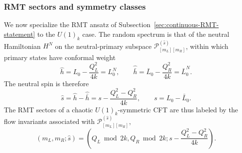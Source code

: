 \documentclass[11pt]{article}
\numberwithin{equation}{section}
\begin{document}
\subsubsection{RMT sectors and symmetry classes}
\label{sec:U1-RMT-expectations}

We now specialize the RMT ansatz of Subsection~\ref{sec:continuous-RMT-statement} to the $U(1)_k$ case.
The random spectrum is that of the neutral Hamiltonian $H^N$ on the neutral-primary subspace $\mathcal P_{[m_L][m_R]}^{(\hat s)}$, within which primary states have conformal weight
\begin{equation}
\hat h=L_0-\frac{Q_L^2}{4k}=L_0^N,
\qquad \hat{\bar h}=\bar L_0-\frac{Q_R^2}{4k}=\bar L_0^N.
\end{equation}
The neutral spin is therefore
\begin{equation}
\hat s=\hat h-\hat{\bar h}
 =s-\frac{Q_L^2-Q_R^2}{4k},
\qquad s=L_0-\bar L_0.
\label{eq:neutral-spin}
\end{equation}
The RMT sectors of a chaotic $U(1)_k$-symmetric CFT are thus labeled by the flow invariants associated with $\mathcal P_{[m_L][m_R]}^{(\hat s)}$,
\begin{equation}
(m_L,m_R;\hat s)
 =\left(Q_L\bmod2k,Q_R\bmod2k;
 s-\frac{Q_L^2-Q_R^2}{4k}\right).
\label{eq:U1-sector-labels}
\end{equation}
\end{document}
